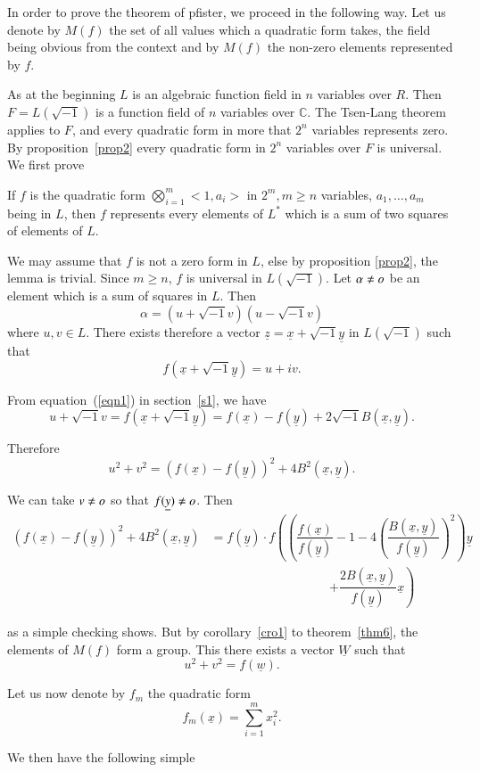 In order to prove the theorem of pfister, we proceed in the following
way. Let us denote by $M(f)$ the set of all values which a quadratic
form takes, the field being obvious from the context and by $M(f)$ the
non-zero elements represented by $f$. 

As at the beginning $L$ is an algebraic function field in $n$
variables over $R$. Then $F=L(\sqrt{-1})$ is a function field of $n$
variables over $\mathbb{C}$. The Tsen-Lang theorem applies to $F$, and
every quadratic form in more that $2^{n}$ variables represents
zero. By proposition~\ref{prop2} every quadratic form in $2^{n}$ variables
over $F$ is universal. We first prove 


\begin{lem}\label{lem7}
If $f$ is the quadratic form $\bigotimes\limits_{i=1}^{m}<1, a_i>$ in
$2^{m},m\geq n$ variables, $a_1,\ldots,a_m$ being in $L$, then $f$
represents every elements of $L^{\ast}$ which is a sum of two squares
of elements of $L$. 
\end{lem}

\begin{Proof}
We may assume that $f$ is not a zero form in $L$, else by proposition
\ref{prop2}, the lemma is trivial. Since $m\geq n$, $f$ is universal
in $L\left(\sqrt{-1}\right)$. Let $\alpha\neq o$ be an element which is a sum
of squares in $L$. Then 
$$
\alpha=\left(u+\sqrt{-1} v\right)\left(u-\sqrt{-1}v\right)
$$
where $u, v\in L$. There exists therefore a vector
$\underline{z}=\underline{x}+\sqrt{-1}\underline{y}$ in $L\left(\sqrt{-1}\right)$
such that 
$$
f\left(\underline{x}+\sqrt{-1}\underline{y}\right)=u+iv.
$$ 

From equation~(\ref{eqn1}) in section~\ref{s1}, we have 
$$
u+\sqrt{-1}v=f\left(\underline{x}+\sqrt{-1}\underline{y}\right)=f(\underline{x})-f(\underline{y})+2\sqrt{-1}
B(\underline{x}, \underline{y}).
$$

Therefore
$$
u^{2}+v^{2}=(f(\underline{x})-f(\underline{y}))^{2}+4B^{2}(\underline{x}, \underline{y}).
$$

We can take $v\neq o$ so that $f(\underline{y})\neq o$. Then 
\begin{equation*}
\begin{aligned}
(f(\underline{x})-f(\underline{y}))^{2}+4B^{2}(\underline{x},
  \underline{y})&=f(\underline{y})\cdot
  f\left(\left(\dfrac{f(\underline{x})}{f(\underline{y})}-1-4\left(\dfrac{B(\underline{x},\underline{y})}{f(\underline{y})}\right)^{2}\right)\underline{y}\right.\\
&\hspace{4cm}\left.+\dfrac{2B(\underline{x},\underline{y})}{f(\underline{y})}\underline{x}\right)
\end{aligned}
\end{equation*}

as a simple checking shows. But by corollary~\ref{cro1} to theorem~\ref{thm6}, the elements of $M(f)$ form a group. This there exists a
vector $\underline{W}$ such that 
$$
u^{2}+v^{2}=f(\underline{w}).
$$

Let us now denote by $f_m$ the quadratic form 
$$
f_m(\underline{x})=\sum\limits_{i=1}^{m}x^{2}_i.
$$

We then have the following simple
\end{Proof}

